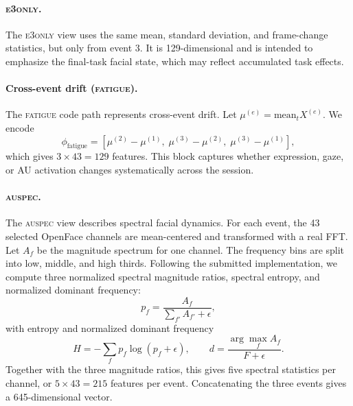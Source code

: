 \documentclass[sigconf,screen,review]{acmart}
\begin{document}
\paragraph{\textsc{e3only}.}
The \textsc{e3only} view uses the same mean, standard deviation, and
frame-change statistics, but only from event 3. It is 129-dimensional and is
intended to emphasize the final-task facial state, which may reflect accumulated
task effects.

\paragraph{Cross-event drift (\textsc{fatigue}).}
The \textsc{fatigue} code path represents cross-event drift. Let
$\mu^{(e)}=\mathrm{mean}_t X^{(e)}$. We encode
\begin{equation}
\phi_{\text{fatigue}} =
\left[
\mu^{(2)}-\mu^{(1)},\;
\mu^{(3)}-\mu^{(2)},\;
\mu^{(3)}-\mu^{(1)}
\right],
\label{eq:fatigue}
\end{equation}
which gives $3\times43=129$ features. This block captures whether expression,
gaze, or AU activation changes systematically across the session.

\paragraph{\textsc{auspec}.}
The \textsc{auspec} view describes spectral facial dynamics. For each event, the
43 selected OpenFace channels are mean-centered and transformed with a real FFT.
Let $A_f$ be the magnitude spectrum for one channel. The frequency bins are
split into low, middle, and high thirds. Following the submitted implementation,
we compute three normalized spectral magnitude ratios, spectral entropy, and
normalized dominant frequency:
\begin{equation}
p_f=\frac{A_f}{\sum_{f'} A_{f'}+\epsilon},
\label{eq:auspec}
\end{equation}
with entropy and normalized dominant frequency
\begin{equation}
H=-\sum_f p_f\log(p_f+\epsilon),
\qquad
d=\frac{\arg\max_f A_f}{F+\epsilon}.
\label{eq:auspec-extra}
\end{equation}
Together with the three magnitude ratios, this gives five spectral statistics
per channel, or $5\times43=215$ features per event. Concatenating the three
events gives a 645-dimensional vector.
\end{document}
